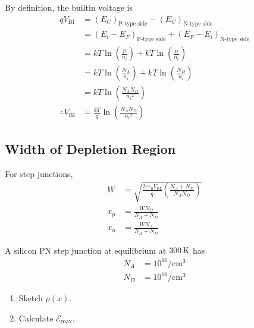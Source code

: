 \documentclass[titlepage, fleqn, a4paper, 12pt, twoside]{article}
\theoremstyle{definition}
\theoremstyle{theorem}
\begin{document}
By definition, the builtin voltage is
\begin{align*}
	q V_{\text{BI}} &= (E_C)_{\text{P-type side}} - (E_C)_{\text{N-type side}}\\
	&= (E_i - E_F)_{\text{P-type side}} + (E_F - E_i)_{\text{N-type side}}\\
	&= k T \ln\left( \frac{p}{n_i} \right) + k T \ln\left( \frac{n}{n_i} \right)\\
	&= k T \ln\left( \frac{N_A}{n_i} \right) + k T \ln\left( \frac{N_D}{n_i} \right)\\
	&= k T \ln\left( \frac{N_A N_D}{{n_i}^2} \right)\\
	\therefore V_{\text{BI}} &= \frac{k T}{q} \ln\left( \frac{N_A N_D}{{n_i}^2} \right)
\end{align*}

\subsection{Width of Depletion Region}

For step junctions,
\begin{align*}
	W &= \sqrt{\frac{2 \varepsilon \varepsilon_0 V_{\text{BI}}}{q} \left( \frac{N_A + N_D}{N_A N_D} \right)}\\
	x_p &= \frac{W N_D}{N_A + N_D}\\
	x_n &= \frac{W N_A}{N_A + N_D}
\end{align*}

\begin{question}
	A silicon PN step junction at equilibrium at $300 \kelvin$ has
	\begin{align*}
		N_A &= 10^{16} \si{\per\centi\metre\cubed}\\
		N_D &= 10^{16} \si{\per\centi\metre\cubed}
	\end{align*}
	\begin{enumerate}
		\item Sketch $\rho(x)$.
		\item Calculate $\mathcal{E}_{\text{max}}$.
	\end{enumerate}
\end{question}
\end{document}

